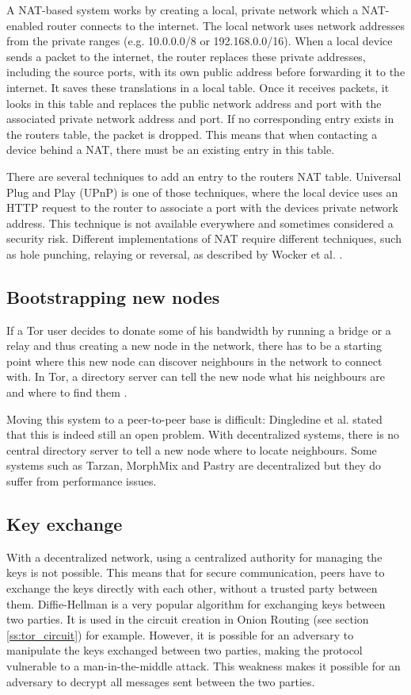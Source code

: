 \documentclass{article}
\begin{document}
		A NAT-based system works by creating a local, private network which a NAT-enabled router connects to the internet. The local network uses network addresses from the private ranges (e.g. 10.0.0.0/8 or 192.168.0.0/16). When a local device sends a packet to the internet, the router replaces these private addresses, including the source ports, with its own public address before forwarding it to the internet. It saves these translations in a local table. Once it receives packets, it looks in this table and replaces the public network address and port with the associated private network address and port. If no corresponding entry exists in the routers table, the packet is dropped. This means that when contacting a device behind a NAT, there must be an existing entry in this table.
		
		There are several techniques to add an entry to the routers NAT table. Universal Plug and Play (UPnP) is one of those techniques, where the local device uses an HTTP request to the router to associate a port with the devices private network address. This technique is not available everywhere and sometimes considered a security risk. Different implementations of NAT require different techniques, such as hole punching, relaying or reversal, as described by Wocker et al. \cite{wacker2008nat}.

	\subsection{Bootstrapping new nodes}
		If a Tor user decides to donate some of his bandwidth by running a bridge or a relay and thus creating a new node in the network, there has to be a starting point where this new node can discover neighbours in the network to connect with. In Tor, a directory server can tell the new node what his neighbours are and where to find them \cite{dingledine2004tor}.
		
		Moving this system to a peer-to-peer base is difficult: Dingledine et al. stated that this is indeed still an open problem. With decentralized systems, there is no central directory server to tell a new node where to locate neighbours. Some systems such as Tarzan, MorphMix and Pastry \cite{rowstron2001pastry, rennhard2002introducing} are decentralized but they do suffer from performance issues.

	\subsection{Key exchange}
		With a decentralized network, using a centralized authority for managing the keys is not possible. This means that for secure communication, peers have to exchange the keys directly with each other, without a trusted party between them. Diffie-Hellman is a very popular algorithm for exchanging keys between two parties. It is used in the circuit creation in Onion Routing (see section \ref{ss:tor_circuit}) for example. However, it is possible for an adversary to manipulate the keys exchanged between two parties, making the protocol vulnerable to a man-in-the-middle attack. This weakness makes it possible for an adversary to decrypt all messages sent between the two parties.
\end{document}
